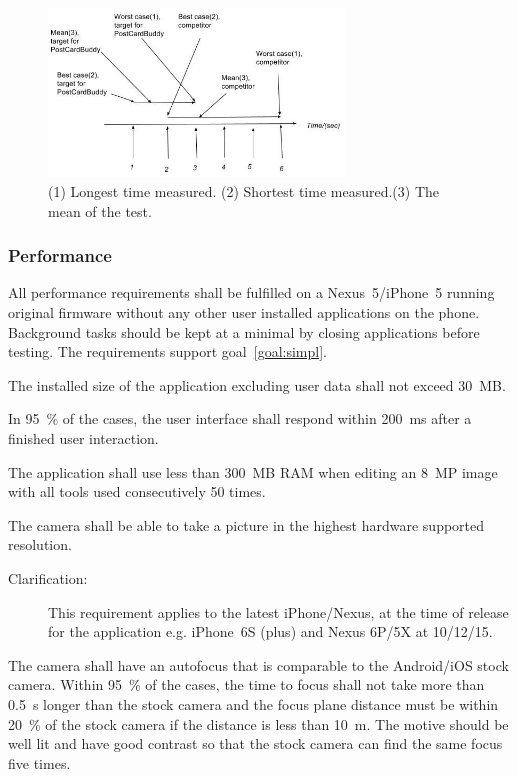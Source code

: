 \documentclass[10pt,a4paper]{article}
\begin{document}
\begin{figure}[h!]
\centering
\includegraphics[width=0.7\textwidth]{QUPER_v1.jpg}
\caption{ (1) Longest time measured. (2) Shortest time measured.(3) The mean of the test. }
\label{fig:quper}
\end{figure}


\subsubsection{Performance}
All performance requirements shall be fulfilled on a Nexus~5/iPhone~5 running original firmware without any other user installed applications on the phone. Background tasks should be kept at a minimal by closing applications before testing. The requirements support goal~\ref{goal:simpl}.

\begin{description}
	\item [Req \thesubsubsection {.\theperf} Application size] The installed size of the application excluding user data shall not exceed 30~MB.	

	\item [Req \thesubsubsection {.\theperf} User interface speed] In 95~\% of the cases, the user interface shall respond within 200~ms after a finished user interaction.

	\item [Req \thesubsubsection {.\theperf} Memory] The application shall use less than 300~MB RAM when editing an 8~MP image with all tools used consecutively 50 times.
	\item [Req \thesubsubsection {.\theperf} Picture quality] The camera shall be able to take a picture in the highest hardware supported resolution. 
	\begin{description}
	 \item[Clarification:] This requirement applies to the latest iPhone/Nexus, at the time of release for the application e.g. iPhone~6S (plus) and Nexus 6P/5X at 10/12/15.
	 \end{description}
	\item [Req \thesubsubsection {.\theperf} Autofocus] The camera shall have an autofocus that is comparable to the Android/iOS stock camera. Within 95~\% of the cases, the time to focus shall not take more than 0.5~s longer than the stock camera and the focus plane distance must be within 20~\% of the stock camera if the distance is less than 10~m. The motive should be well lit and have good contrast so that the stock camera can find the same focus five times. 
\end{description}
\end{document}
